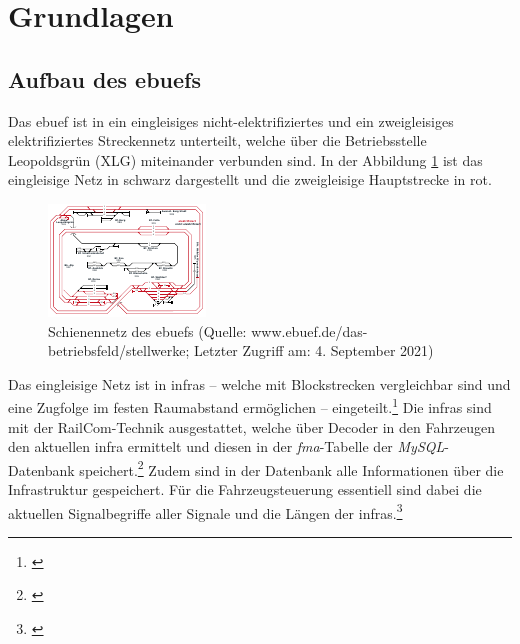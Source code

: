\section{Grundlagen} \label{grundlagenKapitel}
\subsection{Aufbau des \acl{ebuef}s}
Das \ac{ebuef} ist in ein eingleisiges nicht-elektrifiziertes und ein zweigleisiges elektrifiziertes Streckennetz unterteilt, welche über die Betriebsstelle Leopoldsgrün (XLG) miteinander verbunden sind. In der Abbildung \ref{fig:ebuefNetz} ist das eingleisige Netz in schwarz dargestellt und die zweigleisige Hauptstrecke in rot.
\begin{figure}
  \includegraphics[width=\linewidth]{../images/netz/plan.pdf}
  \caption[Schienennetz des \ac{ebuef}s]{Schienennetz des \ac{ebuef}s (Quelle: www.ebuef.de/das-betriebs\-feld/stell\-werke; Letzter Zugriff am: 4. September 2021)}
  \label{fig:ebuefNetz}
\end{figure}
Das eingleisige Netz ist in \acp{infra} -- welche mit Blockstrecken vergleichbar sind und eine Zugfolge im festen Raumabstand ermöglichen -- eingeteilt.\footnote{\citet[S. 7, 42]{pachl1999systemtechnik}} Die \acp{infra} sind mit der RailCom-Technik ausgestattet, welche über Decoder in den Fahrzeugen den aktuellen \ac{infra} ermittelt und diesen in der \textit{fma}-Tabelle der \textit{MySQL}-Datenbank speichert.\footnote{\cite{railcomnorm}} Zudem sind in der Datenbank alle Informationen über die Infrastruktur gespeichert. Für die Fahrzeugsteuerung essentiell sind dabei die aktuellen Signalbegriffe aller Signale und die Längen der \acp{infra}.\footnote{\cite{ebuef}}

